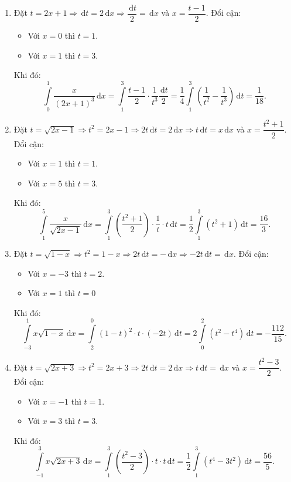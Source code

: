 \begin{bt}
{\begin{enumerate}
				\item Đặt $t=2x+1 \Rightarrow \mathrm{\,d}t=2\mathrm{\,d}x \Rightarrow \dfrac{\mathrm{\,d}t}{2}=\mathrm{\,d}x$ và $x=\dfrac{t-1}{2}$. Đổi cận:
				\begin{itemize}
					\item Với $x=0$ thì $t=1$.
					\item Với $x=1$ thì $t=3$.
				\end{itemize}
				Khi đó:
				$$\displaystyle\int\limits_0^1 \dfrac{x}{(2x+1)^3}\mathrm{\,d}x=\displaystyle\int\limits_1^3 \dfrac{t-1}{2}\cdot \dfrac{1}{t^3}\dfrac{\mathrm{\,d}t}{2}=\dfrac{1}{4}\displaystyle\int\limits_1^3 \left(\dfrac{1}{t^2}-\dfrac{1}{t^3}\right)\mathrm{\,d}t=\dfrac{1}{18}.$$
				\item Đặt $t=\sqrt{2x-1}\Rightarrow t^2=2x-1 \Rightarrow 2t\mathrm{\,d}t=2\mathrm{\,d}x \Rightarrow t\mathrm{\,d}t=x\mathrm{\,d}x$ và $x=\dfrac{t^2+1}{2}$. Đổi cận:
				\begin{itemize}
					\item Với $x=1$ thì $t=1$.
					\item Với $x=5$ thì $t=3$.
				\end{itemize}
				Khi đó:
				$$\displaystyle\int\limits_1^5\dfrac{x}{\sqrt{2x-1}}\mathrm{\,d}x=\displaystyle\int\limits_1^3 \left(\dfrac{t^2+1}{2}\right)\cdot \dfrac{1}{t}\cdot t\mathrm{\,d}t=\dfrac{1}{2}\displaystyle\int\limits_1^3 (t^2+1)\mathrm{\,d}t=\dfrac{16}{3}.$$
				\item Đặt $t=\sqrt{1-x} \Rightarrow t^2=1-x \Rightarrow 2t\mathrm{\,d}t=-\mathrm{\,d}x\Rightarrow -2t\mathrm{\,d}t=\mathrm{\,d}x$. Đổi cận:
				\begin{itemize}
					\item Với $x=-3$ thì $t=2$.
					\item Với $x=1$ thì $t=0$
				\end{itemize}
				Khi đó:
				$$\displaystyle\int\limits_{-3}^1x\sqrt{1-x}\mathrm{\,d}x=\displaystyle\int\limits_2^0(1-t)^2\cdot t\cdot (-2t)\mathrm{\,d}t=2\displaystyle\int\limits_0^2(t^2-t^4)\mathrm{\,d}t=-\dfrac{112}{15}.$$
				\item Đặt $t=\sqrt{2x+3} \Rightarrow t^2=2x+3 \Rightarrow 2t\mathrm{\,d}t=2\mathrm{\,d}x \Rightarrow t\mathrm{\,d}t=\mathrm{\,d}x$ và $x=\dfrac{t^2-3}{2}$. Đổi cận:
				\begin{itemize}
					\item Với $x=-1$ thì $t=1$.
					\item Với $x=3$ thì $t=3$.
				\end{itemize}
				Khi đó:
				$$\displaystyle\int\limits_{-1}^3x\sqrt{2x+3}\mathrm{\,d}x=\displaystyle\int\limits_1^3\left(\dfrac{t^2-3}{2}\right)\cdot t\cdot t\mathrm{\,d}t=\dfrac{1}{2}\displaystyle\int\limits_1^3(t^4-3t^2)\mathrm{\,d}t=\dfrac{56}{5}.$$
			\end{enumerate}
		}
	\end{bt}
	
